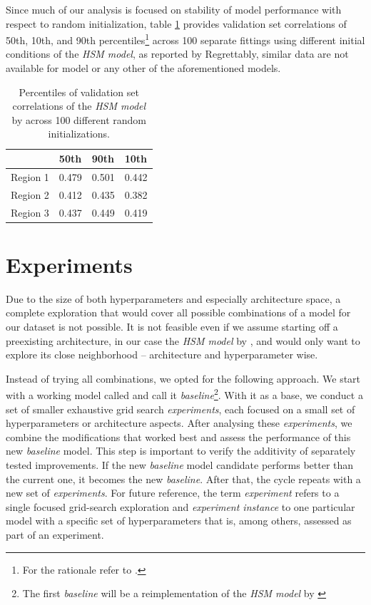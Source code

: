 Since much of our analysis is focused on stability of model performance with respect to random initialization, table \ref{tab:4.3} provides validation set correlations of 50th, 10th, and 90th percentiles\footnote{For the rationale refer to .} across 100 separate fittings using different initial conditions of the \textit{HSM model}, as reported by \citeauthor{antolik} Regrettably, similar data are not available for \citeauthor{klindt} model or any other of the aforementioned models.

\begin{table}[ht]
    \renewcommand{\arraystretch}{1.0}
    \centering
    \begin{tabular}{l|l|l|l}
        \toprule
        & \textbf{50th} & \textbf{90th} & \textbf{10th} \\ \midrule
        Region 1 & 0.479 & 0.501 & 0.442 \\ 
        Region 2 & 0.412 & 0.435 & 0.382 \\ 
        Region 3 & 0.437 & 0.449 & 0.419 \\ \bottomrule

    \end{tabular}
    \caption[Performance percentiles of HSM model]{Percentiles of validation set correlations of the \textit{HSM model} by \citeauthor{antolik} across 100 different random initializations.}
    \label{tab:4.3}
    \renewcommand{\arraystretch}{1.0}
\end{table}

\section{Experiments}\label{ch:4.2.1}

Due to the size of both hyperparameters and especially architecture space, a complete exploration that would cover all possible combinations of a model for our dataset is not possible. It is not feasible even if we assume starting off a preexisting architecture, in our case the \textit{HSM model} by \cite{antolik}, and would only want to explore its close neighborhood -- architecture and hyperparameter wise. 

Instead of trying all combinations, we opted for the following approach. We start with a working model called and call it \textit{baseline}\footnote{The first \textit{baseline} will be a reimplementation of the \textit{HSM model} by \cite{antolik}}. With it as a base, we conduct a set of smaller exhaustive grid search \textit{experiments}, each focused on a small set of hyperparameters or architecture aspects. After analysing these \textit{experiments}, we combine the modifications that worked best and assess the performance of this new \textit{baseline} model. This step is important to verify the additivity of separately tested improvements. If the new \textit{baseline} model candidate performs better than the current one, it becomes the new \textit{baseline}. After that, the cycle repeats with a new set of \textit{experiments}. For future reference, the term \textit{experiment} refers to a single focused grid-search exploration and \textit{experiment instance} to one particular model with a specific set of hyperparameters that is, among others, assessed as part of an experiment.

